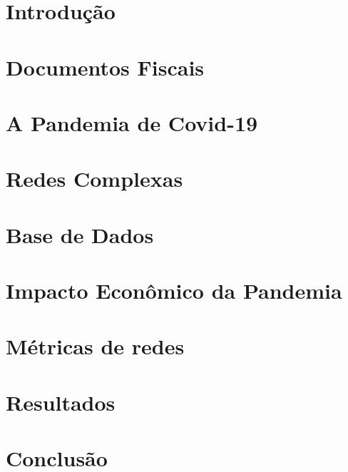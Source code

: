 \documentclass[mestrado, pre-defesa]{packages/icmc}
\begin{document}
\textual

\chapter{Introdução}
\label{chapter:introducao}


\chapter{Documentos Fiscais}
\label{chapter:documenos-fiscais}


\chapter{A Pandemia de Covid-19}
\label{chapter:pandemia}


\chapter{Redes Complexas}
\label{chapter:redes}


\chapter{Base de Dados}
\label{chapter:base-de-dados}


\chapter{Impacto Econômico da Pandemia}
\label{chapter:impacto-economico}


\chapter{Métricas de redes}
\label{chapter:metricas-redes}


\chapter{Resultados}
\label{chapter:resultados}


\chapter{Conclusão}
\label{chapter:conclusão}

\end{document}
